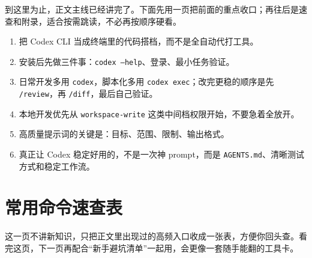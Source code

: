 \documentclass[UTF8,a4paper,12pt]{ctexart}
\begin{document}
到这里为止，正文主线已经讲完了。下面先用一页把前面的重点收口；再往后是速查和附录，适合按需跳读，不必再按顺序硬看。

\begin{tcolorbox}[colback=SummaryLight,colframe=Summary,title=如果你现在只想记住最重要的几点,fonttitle=\bfseries]
\begin{enumerate}
  \item 把 Codex CLI 当成终端里的代码搭档，而不是全自动代打工具。
  \item 安装后先做三件事：\texttt{codex --help}、登录、最小任务验证。
  \item 日常开发多用 \texttt{codex}，脚本化多用 \texttt{codex exec}；改完更稳的顺序是先 \texttt{/review}，再 \texttt{/diff}，最后自己验证。
  \item 本地开发优先从 \texttt{workspace-write} 这类中间档权限开始，不要急着全放开。
  \item 高质量提示词的关键是：目标、范围、限制、输出格式。
  \item 真正让 Codex 稳定好用的，不是一次神 prompt，而是 \texttt{AGENTS.md}、清晰测试方式和稳定工作流。
\end{enumerate}
\end{tcolorbox}

\section{常用命令速查表}

这一页不讲新知识，只把正文里出现过的高频入口收成一张表，方便你回头查。看完这页，下一页再配合“新手避坑清单”一起用，会更像一套随手能翻的工具卡。
\end{document}
